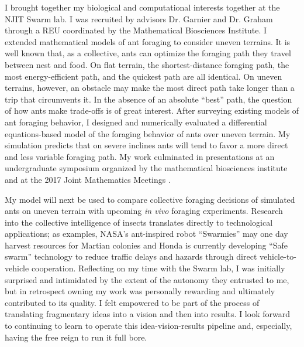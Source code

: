 I brought together my biological and computational interests together at the NJIT Swarm lab.
I was recruited by advisors Dr. Garnier and Dr. Graham through a REU coordinated by the Mathematical Biosciences Institute.
I extended mathematical models of ant foraging to consider uneven terrains.
It is well known that, as a collective, ants can optimize the foraging path they travel between nest and food.
On flat terrain, the shortest-distance foraging path, the most energy-efficient path, and the quickest path are all identical.
On uneven terrains, however, an obstacle may make the most direct path take longer than a trip that circumvents it.
In the absence of an absolute ``best'' path, the question of how ants make trade-offs is of great interest.
After surveying existing models of ant foraging behavior, I designed and numerically evaluated a differential equations-based model of the foraging behavior of ants over uneven terrain.
My simulation predicts that on severe inclines ants will tend to favor a more direct and less variable foraging path.
My work culminated in presentations at an undergraduate symposium organized by the mathematical biosciences institute and at the 2017 Joint Mathematics Meetings \cite{mbi, jmm}.

My model will next be used to compare collective foraging decisions of simulated ants on uneven terrain with upcoming \textit{in vivo} foraging experiments.
Research into the collective intelligence of insects translates directly to technological applications;
as examples, NASA's ant-inspired robot ``Swarmies'' may one day harvest resources for Martian colonies and Honda is currently developing ``Safe swarm'' technology to reduce traffic delays and hazards through direct vehicle-to-vehicle cooperation.
Reflecting on my time with the Swarm lab, I was initially surprised and intimidated by the extent of the autonomy they entrusted to me, but in retrospect owning my work was personally rewarding and ultimately contributed to its quality.
I felt empowered to be part of the process of translating fragmentary ideas into a vision and then into results.
I look forward to continuing to learn to operate this idea-vision-results pipeline and, especially, having the free reign to run it full bore.

